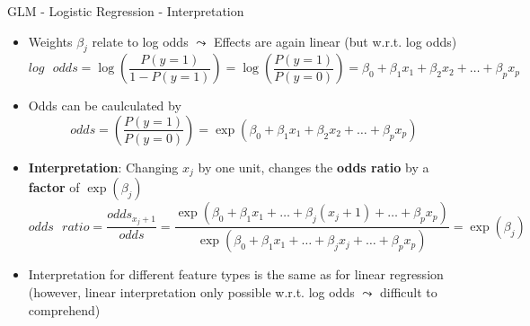 \documentclass[11pt,compress,t,notes=noshow, aspectratio=169, xcolor=table]{beamer}
\begin{document}
\begin{frame}[c]{GLM - Logistic Regression - Interpretation}

    \begin{itemize}
        \item Weights $\beta_j$ relate to log odds $\leadsto$ Effects are again linear (but w.r.t. log odds)
        $$log\text{ }odds = \log \left(\frac{P(y = 1)}{1 - P(y=1)}\right) = \log \left(\frac{P(y = 1)}{P(y=0)}\right) = \beta_0 + \beta_1 x_1 + \beta_2 x_2 + \ldots + \beta_p x_p  $$
        \pause
        \item Odds can be caulculated by 
        $$odds = \left(\frac{P(y = 1)}{P(y=0)}\right) = \exp(\beta_0 + \beta_1 x_1 + \beta_2 x_2 + \ldots + \beta_p x_p)  $$
        \item \textbf{Interpretation}: Changing $x_j$ by one unit, changes the \textbf{odds ratio} by a \textbf{factor} of $\exp(\beta_j)$
        $$odds\text{ }ratio = \frac{odds_{x_j+1}}{odds} = \frac{\exp(\beta_0 + \beta_1 x_1 + \ldots + \beta_j (x_j+1) + \ldots + \beta_p x_p)}{\exp(\beta_0 + \beta_1 x_1 + \ldots + \beta_j x_j + \ldots + \beta_p x_p)} = \exp{(\beta_j)} $$
        \pause
        \item Interpretation for different feature types is the same as for linear regression (however, linear interpretation only possible w.r.t. log odds $\leadsto$ difficult to comprehend)
    \end{itemize}	

\end{frame}
\end{document}
